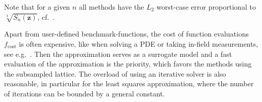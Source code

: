 \documentclass[a4paper]{amsart}
\begin{document}
Note that for a given $n$ all methods have the $L_2$ worst-case error proportional to $\sqrt[4]{S_n(\bm z)}$, cf.~.
\begin{table} \centering
    \vspace{10pt}
    \caption{Computational cost for the least squares approximation $S_{\mathcal B}^{\bm X_J}$ and the kernel method $A_{\text{ker}}^{\bm X_J}$ with a full and subsampled lattice of size $|J| = \lceil\sqrt{n}\,\log n\rceil$.
    Here $r$ is the number of iterations depending on the condition number of the kernel matrix and $f_{\text{cost}}$ is the cost of a single function evaluation.
    We have $(i,j) = (1,0)$ for product weights, $(i,j) = (2,0)$ for POD weights, and $(i,j) = (2,2)$ for SPOD weights.
    }\label{tab:cost2}
\end{table} 

Apart from user-defined benchmark-functions, the cost of function evaluations $f_{\text{cost}}$ is often expensive, like when solving a PDE or taking in-field measurements, see e.g.~\cite{Kuo2012}.
Then the approximation serves as a surrogate model and a fast evaluation of the approximation is the priority, which favors the methods using the subsampled lattice.
The overload of using an iterative solver is also reasonable, in particular for the least squares approximation, where the number of iterations can be bounded by a general constant.
\end{document}
